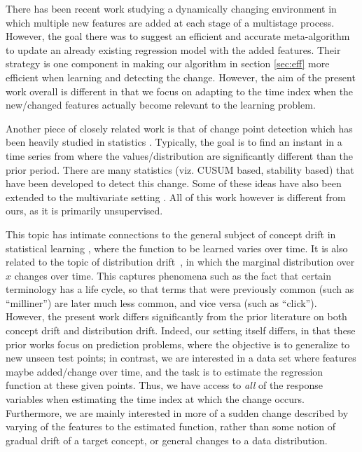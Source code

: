 \documentclass{article}
\begin{document}
There has been recent work \cite{jmlr2014} studying a
dynamically changing environment in which multiple new features are
added at each stage of a multistage process. However, the goal there was to suggest an
efficient and accurate meta-algorithm to update an already existing
regression model with the added features. Their strategy is one
component in making our algorithm in section \ref{sec:eff} more efficient when learning and
detecting the change.  However, the aim of the present work overall is 
different in that we focus on adapting to the time index when the new/changed
features actually become relevant to the learning problem.

Another piece of closely related work is that of change point
detection which has been heavily studied in statistics
\cite{cpd}. Typically, the goal is to find an instant in a time series
from where the values/distribution are significantly different than
the prior period. There are many statistics (viz. CUSUM based,
stability based) that have been developed to detect this change. Some
of these ideas have also been extended to the multivariate setting
\cite{cpd2}. All of this work however is different from ours, as it is primarily unsupervised.

This topic has intimate connections to the general subject of concept
drift in statistical learning \cite{min_concept,cd}, where the
function to be learned varies over time.  It is also related to the
topic of distribution drift~\cite{dd}, in which the marginal
distribution over $x$ changes over time. This captures phenomena such
as the fact that certain terminology has a life cycle, so that terms
that were previously common (such as ``milliner'') are later much less
common, and vice versa (such as ``click'').  However, the present work
differs significantly from the prior literature on both concept drift
and distribution drift.  Indeed, our setting itself differs, in that
these prior works focus on prediction problems, where the objective is
to generalize to new unseen test points; in contrast, we are
interested in a data set where features maybe added/change over time, and the task is to estimate the
regression function at these given points.  Thus, we have access to
\emph{all} of the response variables when estimating the time index at
which the change occurs.  Furthermore, we are mainly interested in more of a sudden change described by varying of the features
to the estimated function, rather than some notion of gradual drift of a
target concept, or general changes to a data distribution.
\end{document}

